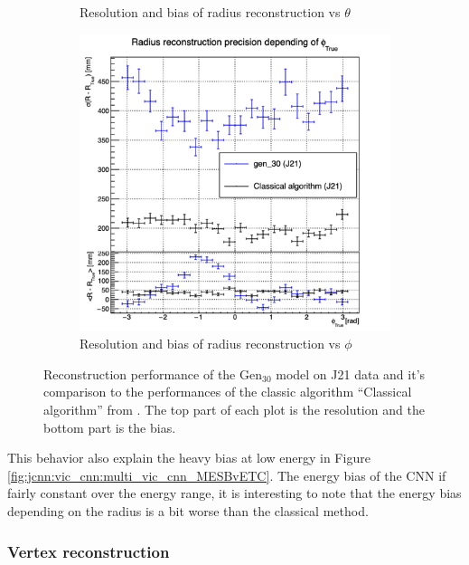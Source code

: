 \documentclass[../main.tex]{subfiles}
\begin{document}
{{\begin{figure}[ht]
\begin{subfigure}[t]{0.32\linewidth}
    \caption{Resolution and bias of radius reconstruction vs $\theta$}
    \label{fig:jcnn:vic_cnn:multi_vic_cnn_MSBvTTC}
  \end{subfigure}
  \begin{subfigure}[t]{0.32\linewidth}
    \centering
    \includegraphics[width=\linewidth]{images/jcnn/vic_cnn/multi_vic_cnn_MSBvPTC.png}
    \caption{Resolution and bias of radius reconstruction vs $\phi$}
    \label{fig:jcnn:vic_cnn:multi_vic_cnn_MSBvPTC}
  \end{subfigure}
  \caption{Reconstruction performance of the $\mathrm{Gen}_{30}$ model on J21 data and it's comparison to the performances of the classic algorithm ``Classical algorithm'' from \cite{lebrin_towards_2022}. The top part of each plot is the resolution and the bottom part is the bias.}
  \label{fig:jcnn:vic_cnn}
\end{figure}

This behavior also explain the heavy bias at low energy in Figure \ref{fig:jcnn:vic_cnn:multi_vic_cnn_MESBvETC}. The energy bias of the CNN if fairly constant over the energy range, it is interesting to note that the energy bias depending on the radius is a bit worse than the classical method.

\subsubsection{Vertex reconstruction}

}}
\end{document}
